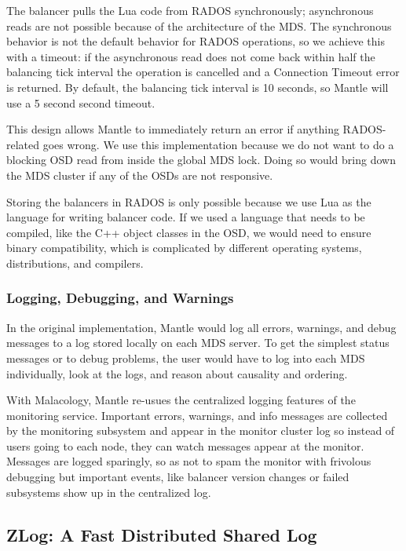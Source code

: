 \documentclass[preprint]{sigplanconf-eurosys}
\begin{document}
The balancer pulls the Lua code from RADOS synchronously; asynchronous reads
are not possible because of the architecture of the MDS. The synchronous
behavior is not the default behavior for RADOS operations, so we achieve this
with a timeout: if the asynchronous read does not come back within half the
balancing tick interval the operation is cancelled and a Connection Timeout
error is returned. By default, the balancing tick interval is 10 seconds, so
Mantle will use a 5 second second timeout.

This design allows Mantle to immediately return an error if anything
RADOS-related goes wrong.  We use this implementation because we do not want to
do a blocking OSD read from inside the global MDS lock. Doing so would bring
down the MDS cluster if any of the OSDs are not responsive.

Storing the balancers in RADOS is only possible because we use Lua as the
language for writing balancer code. If we used a language that needs to be
compiled, like the C++ object classes in the OSD, we would need to ensure
binary compatibility, which is complicated by different operating systems,
distributions, and compilers.

\subsubsection{Logging, Debugging, and Warnings}

In the original implementation, Mantle would log all errors, warnings, and
debug messages to a log stored locally on each MDS server. To get the simplest
status messages or to debug problems, the user would have to log into each MDS
individually, look at the logs, and reason about causality and ordering.

With Malacology, Mantle re-usues the centralized logging features of the
monitoring service. Important errors, warnings, and info messages are collected
by the monitoring subsystem and appear in the monitor cluster log so instead of
users going to each node, they can watch messages appear at the monitor.
Messages are logged sparingly, so as not to spam the monitor with frivolous
debugging but important events, like balancer version changes or failed
subsystems show up in the centralized log.

\subsection{ZLog: A Fast Distributed Shared Log}
\label{sec:zlog}
\end{document}

